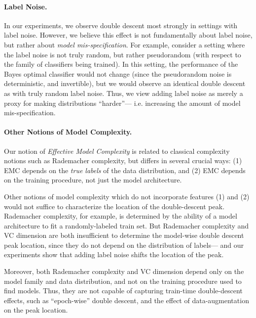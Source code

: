 
\paragraph{Label Noise.}
In our experiments, we observe double descent most strongly in settings with label noise.
However, we believe this effect is not fundamentally about label noise,
but rather about \emph{model mis-specification}.
For example, consider a setting where the label noise is not truly random,
but rather pseudorandom (with respect to the family of classifiers being trained).
In this setting, the performance of the Bayes optimal classifier would not change
(since the pseudorandom noise is deterministic, and invertible),
but we would observe an identical double descent as with truly random label noise.
Thus, we view adding label noise as merely a proxy for making distributions ``harder''---
i.e. increasing the amount of model mis-specification.

\paragraph{Other Notions of Model Complexity.}
Our notion of \emph{Effective Model Complexity} is related to classical complexity notions
such as Rademacher complexity, but differs in several crucial ways:
(1) EMC depends on the \emph{true labels} of the data distribution,
and (2) EMC depends on the training procedure, not just the model architecture.

Other notions of model complexity which do not incorporate features (1) and (2)
would not suffice to characterize the location of the double-descent peak.
Rademacher complexity, for example, is determined by the
ability of a model architecture to fit a randomly-labeled train set.
But Rademacher complexity and VC dimension are both insufficient to 
determine the model-wise double descent peak location, since they do
not depend on the distribution of labels--- and our experiments show that adding label noise
shifts the location of the peak.

Moreover, both Rademacher complexity and VC dimension
depend only on the model family and data distribution, and not
on the training procedure used to find models.
Thus, they are not capable of capturing train-time double-descent effects,
such as ``epoch-wise'' double descent, and the effect of data-augmentation on
the peak location.